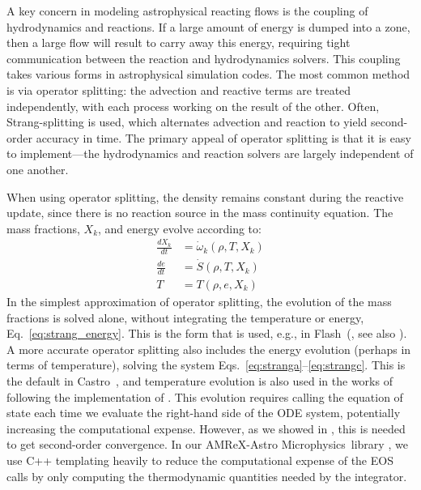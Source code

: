 \documentclass[preprint,linenumbers]{aastex631}
\newcommand{\omegadot}{\dot{\omega}}
\newcommand{\castro}{{\sf Castro}}
\newcommand{\amrex}{{\sf AMReX}}
\newcommand{\microphysics}{{\sf Microphysics}}
\newcommand{\flash}{{\sf Flash}}
\begin{document}
A key concern in modeling astrophysical reacting flows is the coupling
of hydrodynamics and reactions.  If a large amount of energy is dumped
into a zone, then a large flow will result to carry away this energy,
requiring tight communication between the reaction and hydrodynamics
solvers.  This coupling takes various forms in astrophysical
simulation codes.  The most common method is via operator splitting:
the advection and reactive terms are treated independently, with each
process working on the result of the other.  Often, Strang-splitting
\citep{strang:1968} is used, which alternates advection and reaction
to yield second-order accuracy in time.  The primary appeal of operator
splitting is that it is easy to implement---the hydrodynamics and reaction
solvers are largely independent of one another.

When using operator splitting, the density remains constant during the reactive update, since there
is no reaction source in the mass continuity equation.  The mass
fractions, $X_k$, and energy evolve according to:
\begin{eqnarray}
\frac{dX_k}{dt} &= \omegadot_k(\rho, T, X_k) \label{eq:stranga} \\
\frac{de}{dt} &= \dot{S}(\rho, T, X_k)  \label{eq:strang_energy}\\
T &= T(\rho, e, X_k) \label{eq:strangc}
\end{eqnarray}
In the simplest approximation of operator splitting, the
evolution of the mass fractions is solved alone, without integrating
the temperature or energy, Eq.~\ref{eq:strang_energy}.  This is the form that is used, e.g., in \flash\
(\citealt{flash}, see also \citealt{townsley:2016}).  A more accurate operator splitting also includes the
energy evolution (perhaps in terms of temperature), solving the system Eqs.~\ref{eq:stranga}--\ref{eq:strangc}.  This is the default in \castro~\citep{castro,castro_joss},
and temperature evolution is also used in the works of \citet{gronow:2020,gronow:2021} following the implementation of \citet{pakmor:2012}. This evolution requires
calling the equation of state each time we evaluate the right-hand side
of the ODE system, potentially increasing the computational expense.  However, as we showed in
\citet{strang_rnaas}, this is needed to get second-order convergence.  In our \amrex-Astro \microphysics\ library \citep{microphysics},
we use C++ templating heavily to reduce the computational
expense of the EOS calls by only computing the thermodynamic quantities needed by the integrator.
\end{document}
